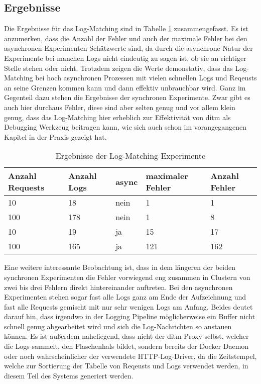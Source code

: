 \documentclass[a4paper]{report}
\begin{document}
\subsection{Ergebnisse}
Die Ergebnisse für das Log-Matching sind in Tabelle \ref{tab:logs} zusammengefasst.
Es ist anzumerken, dass die Anzahl der Fehler und auch der maximale Fehler bei den asynchronen Experimenten Schätzwerte sind, da durch
die asynchrone Natur der Experimente bei manchen Logs nicht eindeutig zu sagen ist, ob sie an richtiger Stelle stehen oder nicht.
Trotzdem zeigen die Werte demonstativ, dass das Log-Matching bei hoch asynchronen Prozessen mit vielen schnellen Logs
und Reqeusts an seine Grenzen kommen kann und dann effektiv unbrauchbar wird. Ganz im Gegenteil dazu stehen die Ergebnisse der
synchronen Experimente. Zwar gibt es auch hier durchaus Fehler, diese sind aber selten genug und vor allem klein genug, dass das Log-Matching
hier erheblich zur Effektivität von ditm als Debugging Werkzeug beitragen kann, wie sich auch schon im vorangegangenen Kapitel in
der Praxis gezeigt hat.
\begin{table}[h]
	\centering
	\caption{Ergebnisse der Log-Matching Experimente}
	\label{tab:logs}
	\begin{tabular}{|l|l|l|l|l|}
		\hline
		Anzahl Requests & Anzahl Logs & async & maximaler Fehler & Anzahl Fehler \\ \hline
		10              & 18          & nein  & 1                & 1             \\ \hline
		100             & 178         & nein  & 1                & 8             \\ \hline
		10              & 19          & ja    & 15               & 17            \\ \hline
		100             & 165         & ja    & 121              & 162           \\ \hline
	\end{tabular}
\end{table}

Eine weitere interessante Beobachtung ist, dass in dem längeren der beiden synchronen Experimenten die Fehler vorwiegend eng zusammen in Clustern
von zwei bis drei Fehlern direkt hintereinander auftreten. Bei den asynchronen Experimenten stehen sogar fast alle Logs ganz am Ende der Aufzeichnung
und fast alle Requests gemischt mit nur sehr wenigen Logs am Anfang. Beides deutet darauf hin, dass irgendwo in der Logging Pipeline möglicherweise
ein Buffer nicht schnell genug abgearbeitet wird und sich die Log-Nachrichten so anstauen können. Es ist außerdem naheliegend, dass nicht der ditm Proxy
selbst, welcher die Logs sammelt, den Flaschenhals bildet, sondern bereits der Docker Daemon oder noch wahrscheinlicher der verwendete HTTP-Log-Driver,
da die Zeitstempel, welche zur Sortierung der Tabelle von Reqeusts und Logs verwendet werden, in diesem Teil des Systems generiert werden.
\end{document}
